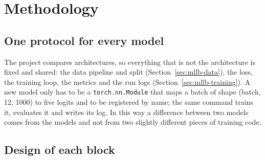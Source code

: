 \section{Methodology}\label{sec:methodology}

\subsection{One protocol for every model}

The project compares architectures, so everything that is not the architecture is fixed and shared: the
data pipeline and split (Section~\ref{sec:mllb-data}), the loss, the training loop, the metrics and the run
logs (Section~\ref{sec:mllb-training}). A new model only has to be a \texttt{torch.nn.Module} that maps a
batch of shape (batch, 12, 1000) to five logits and to be registered by name; the same command trains it,
evaluates it and writes its log. In this way a difference between two models comes from the models and
not from two slightly different pieces of training code.

\subsection{Design of each block}

